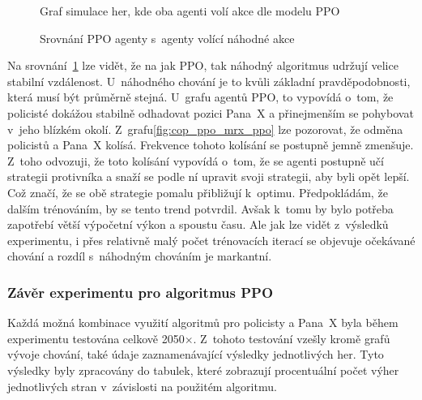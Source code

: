 \begin{figure}[H]
\begin{minipage}{.48\textwidth}
      \caption{Graf simulace her, kde oba agenti volí akce dle modelu PPO}
      \label{fig:cop_ppo_mrx_ppo}
  \end{minipage}
  \caption{Srovnání PPO agenty s~agenty volící náhodné akce}
  \label{fig:srovnani_random_ppo}
  \end{figure}

Na srovnání~\ref{fig:srovnani_random_ppo} lze vidět, že na jak PPO, tak náhodný algoritmus udržují velice stabilní vzdálenost.
U~náhodného chování je to kvůli základní pravděpodobnosti, která musí být průměrně stejná.
U~grafu agentů PPO, to vypovídá o~tom, že policisté dokážou stabilně odhadovat pozici Pana~X a přinejmenším se pohybovat v~jeho blízkém okolí.
Z~grafu\ref{fig:cop_ppo_mrx_ppo} lze pozorovat, že odměna policistů a Pana~X kolísá.
Frekvence tohoto kolísání se postupně jemně zmenšuje.
Z~toho odvozuji, že toto kolísání vypovídá o~tom, že se agenti postupně učí strategii protivníka a snaží se podle ní upravit svoji strategii, aby byli opět lepší.
Což značí, že se obě strategie pomalu přibližují k~optimu.
Předpokládám, že dalším trénováním, by se tento trend potvrdil.
Avšak k~tomu by bylo potřeba zapotřebí větší výpočetní výkon a spoustu času.
Ale jak lze vidět z~výsledků experimentu, i přes relativně malý počet trénovacích iterací se objevuje očekávané chování a rozdíl s~náhodným chováním je markantní.

\subsubsection*{Závěr experimentu pro algoritmus PPO}

Každá možná kombinace využití algoritmů pro policisty a Pana~X byla během experimentu testována celkově 2050$\times$.
Z~tohoto testování vzešly kromě grafů vývoje chování, také údaje zaznamenávající výsledky jednotlivých her.
Tyto výsledky byly zpracovány do tabulek, které zobrazují procentuální počet výher jednotlivých stran v~závislosti na použitém algoritmu.

